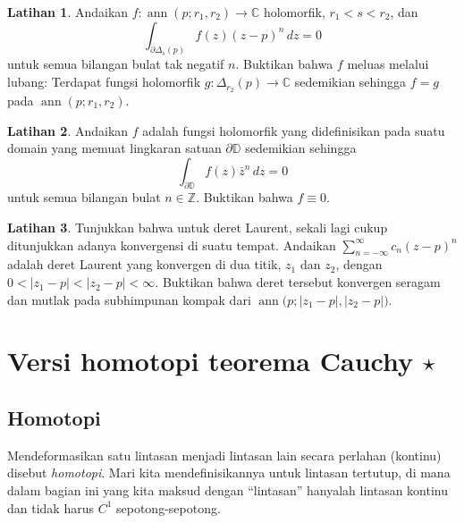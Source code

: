 \documentclass[12pt,openany]{book}
\newcommand{\ann}{\operatorname{ann}}
\newcommand{\sabs}[1]{\lvert {#1} \rvert}
\newcommand{\C}{{\mathbb{C}}}
\newcommand{\Z}{{\mathbb{Z}}}
\newcommand{\D}{{\mathbb{D}}}
\newcommand{\myindex}[1]{#1\index{#1}}
\newcommand{\myquote}[1]{``#1''}
\theoremstyle{plain}
\theoremstyle{remark}
\theoremstyle{definition}
\newenvironment{exbox}{%
    \def\FrameCommand{\vrule width 1pt \relax\hspace{10pt}}%
    \MakeFramed{\advance\hsize-\width\FrameRestore}%
}{%
    \endMakeFramed
}
\theoremstyle{exercise}
\newtheorem{exercise}{Latihan}[section]
\theoremstyle{example}
\begin{document}
\begin{exbox}
\begin{exercise}
Andaikan $f \colon \ann(p;r_1,r_2) \to \C$ holomorfik,
$r_1 < s < r_2$, dan
\begin{equation*}
\int_{\partial \Delta_{s}(p)} f(z){(z-p)}^n
 \, dz = 0
\end{equation*}
untuk semua bilangan bulat tak negatif $n$. Buktikan bahwa $f$ meluas melalui lubang:
Terdapat fungsi holomorfik $g \colon \Delta_{r_2}(p) \to \C$ sedemikian sehingga 
$f = g$ pada $\ann(p;r_1,r_2)$.
\end{exercise}

\begin{exercise}
Andaikan $f$ adalah fungsi holomorfik yang didefinisikan pada suatu domain yang memuat
lingkaran satuan $\partial \D$ sedemikian sehingga
\begin{equation*}
\int_{\partial \D} f(z)\bar{z}^n
 \, dz = 0
\end{equation*}
untuk semua bilangan bulat $n \in \Z$. Buktikan bahwa $f \equiv 0$.
\end{exercise}

\begin{exercise}
Tunjukkan bahwa untuk deret Laurent, sekali lagi cukup ditunjukkan adanya konvergensi
di suatu tempat. Andaikan $\sum_{n=-\infty}^\infty c_n {(z-p)}^n$ adalah deret Laurent
yang konvergen di dua titik, $z_1$ dan $z_2$, dengan
$0 < \sabs{z_1-p} < \sabs{z_2-p} < \infty$.
Buktikan bahwa deret tersebut konvergen seragam dan mutlak pada subhimpunan kompak
dari $\ann\bigl(p;\sabs{z_1-p},\sabs{z_2-p}\bigr)$.
\end{exercise}
\end{exbox}


\section{Versi homotopi teorema Cauchy \texorpdfstring{$\star$}{*}}

\subsection{Homotopi}

Mendeformasikan satu lintasan menjadi lintasan lain secara perlahan (kontinu)
disebut \emph{\myindex{homotopi}}. Mari kita
mendefinisikannya untuk lintasan tertutup,
di mana dalam bagian ini yang kita maksud dengan \myquote{lintasan} hanyalah
lintasan kontinu dan tidak harus $C^1$ sepotong-sepotong.
\end{document}
